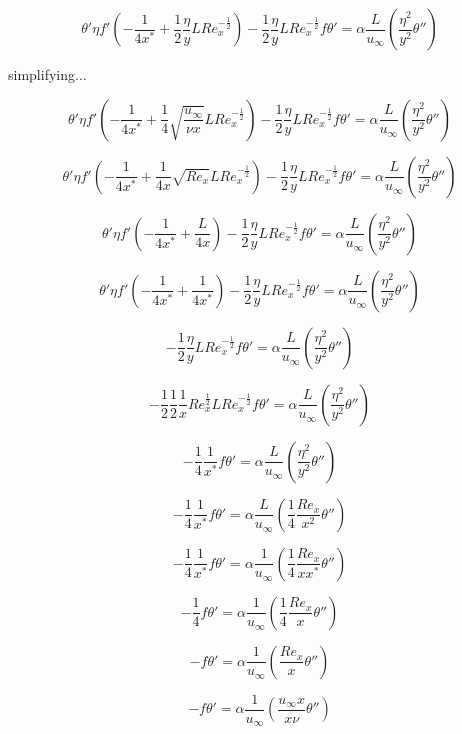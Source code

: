 \documentclass[11pt]{article}
\begin{document}
$$\theta' \eta f' ( - \frac{1}{4x^*} +\frac{1}{2} \frac{\eta }{ y} L   Re_x^{-\frac{1}{2}} )   - \frac{1}{2} \frac{\eta }{ y} L   Re_x^{-\frac{1}{2}}  f  \theta'   = \alpha \frac{L}{u_\infty} ( \frac{\eta^2 }{y^2} \theta'' ) $$ 

simplifying...

$$\theta' \eta f' ( - \frac{1}{4x^*} + \frac{1}{4} \sqrt{\frac{u_\infty}{\nu x}}  L   Re_x^{-\frac{1}{2}} )   - \frac{1}{2} \frac{\eta }{ y} L   Re_x^{-\frac{1}{2}}  f  \theta'   = \alpha \frac{L}{u_\infty} ( \frac{\eta^2 }{y^2} \theta'' ) $$ 


$$\theta' \eta f' ( - \frac{1}{4x^*} + \frac{1}{4 x} \sqrt{Re_x}  L   Re_x^{-\frac{1}{2}} )   - \frac{1}{2} \frac{\eta }{ y} L   Re_x^{-\frac{1}{2}}  f  \theta'   = \alpha \frac{L}{u_\infty} ( \frac{\eta^2 }{y^2} \theta'' ) $$ 

$$\theta' \eta f' ( - \frac{1}{4x^*} + \frac{L}{4 x}   )   - \frac{1}{2} \frac{\eta }{ y} L   Re_x^{-\frac{1}{2}}  f  \theta'   = \alpha \frac{L}{u_\infty} ( \frac{\eta^2 }{y^2} \theta'' ) $$ 

$$\theta' \eta f' ( - \frac{1}{4x^*} + \frac{1}{4 x^*}   )  - \frac{1}{2} \frac{\eta }{ y} L   Re_x^{-\frac{1}{2}}  f  \theta'   = \alpha \frac{L}{u_\infty} ( \frac{\eta^2 }{y^2} \theta'' ) $$ 

$$ -\frac{1}{2} \frac{\eta }{ y} L   Re_x^{-\frac{1}{2}}  f  \theta'   = \alpha \frac{L}{u_\infty} ( \frac{\eta^2 }{y^2} \theta'' ) $$

 $$- \frac{1}{2} \frac{1 }{2} \frac{1}{x} Re_x^{\frac{1}{2}} L   Re_x^{-\frac{1}{2}}  f  \theta'   = \alpha \frac{L}{u_\infty} ( \frac{\eta^2 }{y^2} \theta'' ) $$


 $$-\frac{1}{4} \frac{1}{x^*}   f  \theta'   = \alpha \frac{L}{u_\infty} ( \frac{\eta^2 }{y^2} \theta'' ) $$
 
  $$- \frac{1}{4} \frac{1}{x^*}   f  \theta'   = \alpha \frac{L}{u_\infty} ( \frac{1}{4} \frac{Re_x}{x^2} \theta'' ) $$

  $$-\frac{1}{4} \frac{1}{x^*}   f  \theta'   = \alpha \frac{1}{u_\infty} ( \frac{1}{4} \frac{Re_x}{x x^*} \theta'' ) $$

  $$ -\frac{1}{4}    f  \theta'   = \alpha \frac{1}{u_\infty} ( \frac{1}{4} \frac{Re_x}{x } \theta'' ) $$

$$ - f  \theta'   = \alpha \frac{1}{u_\infty} ( \frac{Re_x}{x } \theta'' ) $$
  
$$  -   f  \theta'   = \alpha \frac{1}{u_\infty} ( \frac{u_\infty x}{x \nu } \theta'' ) $$
\end{document}
